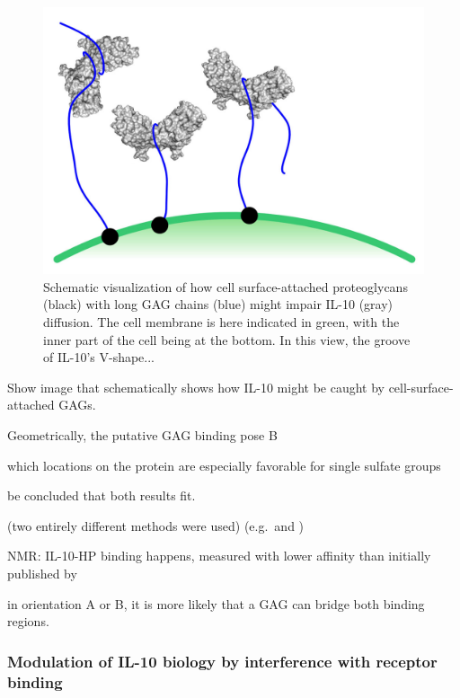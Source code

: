 \begin{figure}
\centering
\includegraphics[width=1.0\textwidth]{gfx/together/agglomeration_small.jpg}
\caption[]{
Schematic visualization of how cell surface-attached proteoglycans (black) with
long GAG chains (blue) might impair IL-10 (gray) diffusion. The cell membrane is
here indicated in green, with the inner part of the cell being at the bottom. In
this view, the groove of IL-10's V-shape...}
\label{fig:together:il10sulfates}
\end{figure}


Show image that schematically shows how IL-10 might be caught by cell-surface-attached GAGs.



Geometrically, the putative GAG binding
pose B


which locations on the protein are
especially favorable for single sulfate groups



be concluded that both results fit.


 (two entirely different methods were used) (e.g.\ and )



NMR: IL-10-HP binding happens, measured with lower affinity than initially published by


in orientation A or B, it is more likely that a GAG can bridge both binding
regions.





\subsubsection{Modulation of IL-10 biology by interference with receptor
binding}


